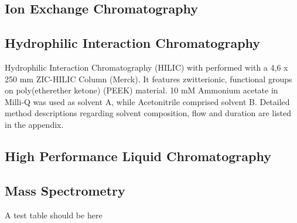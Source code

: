 	\subsection{Ion Exchange Chromatography} %
	\label{sub:ion_exchange_chromatography}


	\subsection{Hydrophilic Interaction Chromatography} %
	\label{sub:hilic}

	Hydrophilic Interaction Chromatography (HILIC) with performed with a 4,6 x 250 mm ZIC-HILIC Column (Merck). It features zwitterionic, functional groups on poly(etherether ketone) (PEEK) material.
	10 mM Ammonium acetate in Milli-Q  was used as solvent A, while Acetonitrile comprised solvent B. Detailed method descriptions regarding solvent composition, flow and duration are listed in the appendix.

	\subsection{High Performance Liquid Chromatography} %
	\label{sub:hplc}

	\subsection{Mass Spectrometry} %
	\label{sub:mass_spectrometry}

A test table should be here

